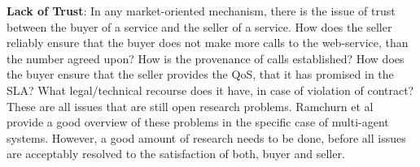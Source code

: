 \documentclass[10pt,journal,compsoc]{IEEEtran}
\begin{document}
\textbf{Lack of Trust}: In any market-oriented mechanism, there is the issue of trust between the buyer of a service and the seller of a service. How does the seller reliably ensure that the buyer does not make more calls to the web-service, than the number agreed upon? How is the provenance of calls established? How does the buyer ensure that the seller provides the QoS, that it has promised in the SLA? What legal/technical recourse does it have, in case of violation of contract? These are all issues that are still open research problems. Ramchurn et al~\cite{Ramchurn2005Trust} provide a good overview of these problems in the specific case of multi-agent systems. However, a good amount of research needs to be done, before all issues are acceptably resolved to the satisfaction of both, buyer and seller.\\
%
\end{document}

